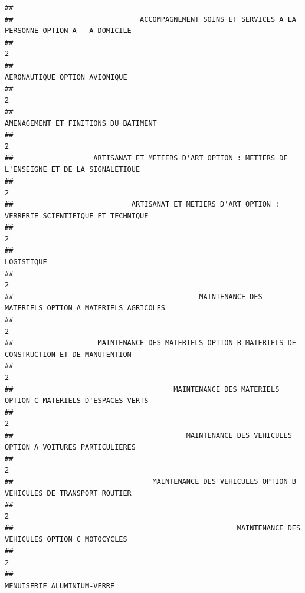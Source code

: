 \documentclass[
]{book}
\begin{document}
\begin{verbatim}
## 
##                              ACCOMPAGNEMENT SOINS ET SERVICES A LA PERSONNE OPTION A - A DOMICILE 
##                                                                                                 2 
##                                                                     AERONAUTIQUE OPTION AVIONIQUE 
##                                                                                                 2 
##                                                              AMENAGEMENT ET FINITIONS DU BATIMENT 
##                                                                                                 2 
##                   ARTISANAT ET METIERS D'ART OPTION : METIERS DE L'ENSEIGNE ET DE LA SIGNALETIQUE 
##                                                                                                 2 
##                            ARTISANAT ET METIERS D'ART OPTION : VERRERIE SCIENTIFIQUE ET TECHNIQUE 
##                                                                                                 2 
##                                                                                        LOGISTIQUE 
##                                                                                                 2 
##                                            MAINTENANCE DES MATERIELS OPTION A MATERIELS AGRICOLES 
##                                                                                                 2 
##                    MAINTENANCE DES MATERIELS OPTION B MATERIELS DE CONSTRUCTION ET DE MANUTENTION 
##                                                                                                 2 
##                                      MAINTENANCE DES MATERIELS OPTION C MATERIELS D'ESPACES VERTS 
##                                                                                                 2 
##                                         MAINTENANCE DES VEHICULES OPTION A VOITURES PARTICULIERES 
##                                                                                                 2 
##                                 MAINTENANCE DES VEHICULES OPTION B VEHICULES DE TRANSPORT ROUTIER 
##                                                                                                 2 
##                                                     MAINTENANCE DES VEHICULES OPTION C MOTOCYCLES 
##                                                                                                 2 
##                                                                        MENUISERIE ALUMINIUM-VERRE 

\end{verbatim}
\end{document}
